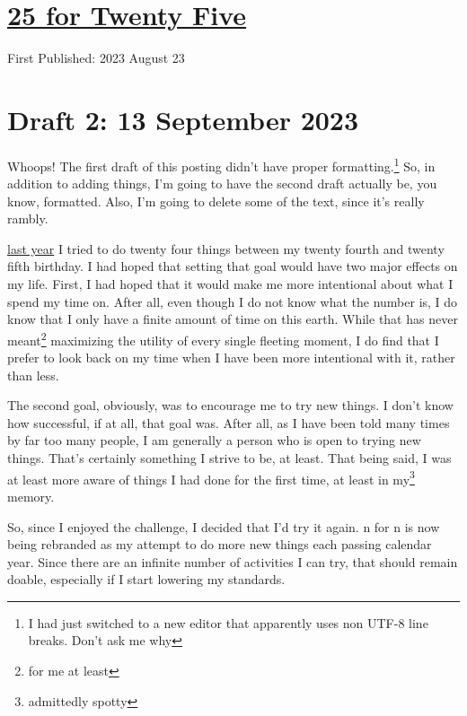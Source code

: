 \documentclass[12pt]{article}[titlepage]
\newcommand{\1}{\={a}}
\newcommand{\2}{\={e}}
\newcommand{\3}{\={\i}}
\newcommand{\4}{\=o}
\newcommand{\5}{\=u}
\newcommand{\6}{\={A}}
\renewcommand{\,}{\textsuperscript{,}}
\begin{document}
\doublespacing
\section{\href{twenty-five.html}{25 for Twenty Five}}
First Published: 2023 August 23

\section{Draft 2: 13 September 2023}
Whoops!
The first draft of this posting didn't have proper formatting.\footnote{I had just switched to a new editor that apparently uses non UTF-8 line breaks.  
Don't ask me why}
So, in addition to adding things, I'm going to have the second draft actually be, you know, formatted. 
Also, I'm going to delete some of the text, since it's really rambly. 
 
\href{twenty-four.html}{last year} I tried to do twenty four things between my twenty fourth and twenty fifth birthday. I had hoped that setting that goal would have two major effects on my life. First, I had hoped that it would make me more intentional about what I spend my time on. After all, even though I do not know what the number is, I do know that I only have a finite amount of time on this earth. While that has never meant\footnote{for me at least} maximizing the utility of every single fleeting moment, I do find that I prefer to look back on my time when I have been more intentional with it, rather than less.
 
The second goal, obviously, was to encourage me to try new things. I don't know how successful, if at all, that goal was. After all, as I have been told many times by far too many people, I am generally a person who is open to trying new things. That's certainly something I strive to be, at least. That being said, I was at least more aware of things I had done for the first time, at least in my\footnote{admittedly spotty} memory.
 
So, since I enjoyed the challenge, I decided that I'd try it again. n for n is now being rebranded as my attempt to do more new things each passing calendar year. Since there are an infinite number of activities I can try, that should remain doable, especially if I start lowering my standards.
 
\end{document}
